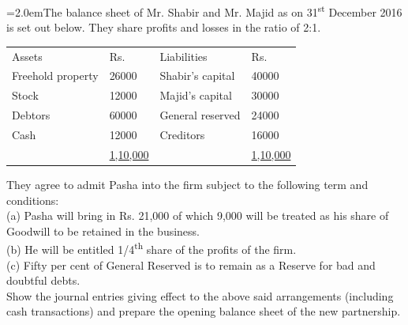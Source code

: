 \documentclass[11pt,a4paper]{article}
\newcommand{\lqn}[2]{\Needspace{6\baselineskip}\par\medskip\noindent\hangindent=2.0em\hangafter=1\makebox[2.0em][l]{\textbf{#1.}}#2\par}
\begin{document}
\lqn{90}{The balance sheet of Mr. Shabir and Mr. Majid as on 31\textsuperscript{st}  December 2016 is set out below. They share profits and losses in the ratio of 2:1.\par
\par\smallskip\noindent\hspace*{1.2em}\begin{tabular}{|llll|}
\hline
Assets & Rs. & Liabilities & Rs. \\
Freehold property & 26000 & Shabir’s capital & 40000 \\
Stock & 12000 & Majid’s capital & 30000 \\
Debtors & 60000 & General reserved & 24000 \\
Cash & 12000 & Creditors & 16000 \\
 & \underline{1,10,000} &  & \underline{1,10,000} \\
\hline
\end{tabular}\par\smallskip
They agree to admit Pasha into the firm subject to the following term and conditions:\\
(a) Pasha will bring in Rs. 21,000 of which 9,000 will be treated as his share of Goodwill to be retained in the business.\\
(b) He will be entitled 1/4\textsuperscript{th}  share of the profits of the firm.\\
(c) Fifty per cent of General Reserved is to remain as a Reserve for bad and doubtful debts.\\
Show the journal entries giving effect to the above said arrangements (including cash transactions) and prepare the opening balance sheet of the new partnership.\par
}
\end{document}
